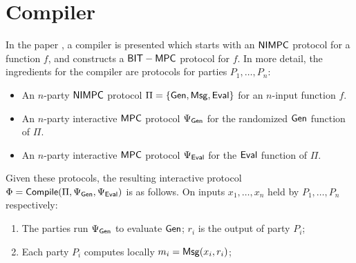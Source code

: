 \section{Compiler}
In the paper \cite{BITMPC}, a compiler is presented which starts with an $\mathsf{NIMPC}$ protocol for a function $f$, and constructs a $\mathsf{BIT-MPC}$ protocol for $f$. In more detail, the ingredients for the compiler are protocols for parties $P_1,\ldots, P_n$: 
\begin{itemize}
\item An $n$-party $\mathsf{NIMPC}$ protocol $\Pi=\{\mathsf{Gen},\mathsf{Msg},\mathsf{Eval}\}$ for an $n$-input function $f$.
\item An $n$-party interactive $\mathsf{MPC}$ protocol $\Psi_{\mathsf{Gen}}$ for the randomized $\mathsf{Gen}$ function of $\Pi$.
\item An $n$-party interactive $\mathsf{MPC}$ protocol $\Psi_{\mathsf{Eval}}$ for the $\mathsf{Eval}$ function of $\Pi$.
\end{itemize}
Given these protocols, the resulting interactive protocol $\Phi = \mathsf{Compile}(\Pi, \Psi_{\mathsf{Gen}},\Psi_{\mathsf{Eval}})$ is as follows. On inputs $x_1,\ldots, x_n$ held by $P_1,\ldots, P_n$ respectively:
\begin{enumerate}
\item The parties run $\Psi_{\mathsf{Gen}}$ to evaluate $\mathsf{Gen}$; $r_i$ is the output of party $P_i$;
\item Each party $P_i$ computes locally $m_i=\mathsf{Msg}(x_i,r_i)$;
\end{enumerate}